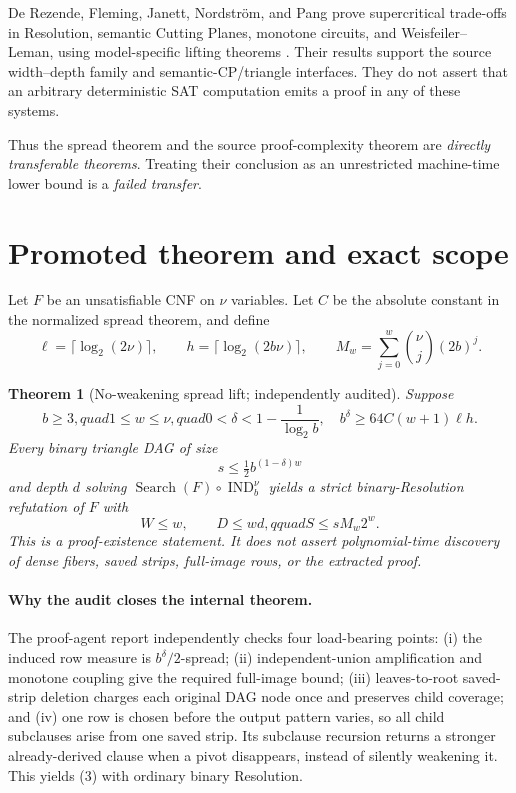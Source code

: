 \documentclass[11pt]{article}
\newtheorem{theorem}{Theorem}
\begin{document}
De Rezende, Fleming, Janett, Nordstr\"om, and Pang prove supercritical trade-offs in
Resolution, semantic Cutting Planes, monotone circuits, and Weisfeiler--Leman, using
model-specific lifting theorems \cite{tradeoff}.  Their results support the source
width--depth family and semantic-CP/triangle interfaces.  They do not assert that an
arbitrary deterministic SAT computation emits a proof in any of these systems.

Thus the spread theorem and the source proof-complexity theorem are
\emph{directly transferable theorems}.  Treating their conclusion as an unrestricted
machine-time lower bound is a \emph{failed transfer}.

\section{Promoted theorem and exact scope}
Let $F$ be an unsatisfiable CNF on $\nu$ variables.  Let $C$ be the absolute
constant in the normalized spread theorem, and define
\[
 \ell=\lceil\log_2(2\nu)\rceil,\qquad
 h=\lceil\log_2(2b\nu)\rceil,\qquad
 M_w=\sum_{j=0}^{w}\binom{\nu}{j}(2b)^j.
\]

\begin{theorem}[No-weakening spread lift; independently audited]
Suppose
\[
 b\ge3,quad 1\le w\le\nu,quad
 0<\delta<1-\frac1{\log_2 b},\quad
 b^\delta\ge64C(w+1)\ell h.                              \tag{2}
\]
Every binary triangle DAG of size
\[
 s\le\tfrac12 b^{(1-\delta)w}
\]
and depth $d$ solving $\operatorname{Search}(F)\circ\operatorname{IND}_b^\nu$
yields a strict binary-Resolution refutation of $F$ with
\[
 W\le w,\qquad D\le wd,qquad S\le sM_w2^w.              \tag{3}
\]
This is a proof-existence statement.  It does not assert polynomial-time discovery
of dense fibers, saved strips, full-image rows, or the extracted proof.
\end{theorem}

\paragraph{Why the audit closes the internal theorem.}
The proof-agent report
independently checks four load-bearing points: (i) the induced row measure is
$b^\delta/2$-spread; (ii) independent-union amplification and monotone coupling give
the required full-image bound; (iii) leaves-to-root saved-strip deletion charges each
original DAG node once and preserves child coverage; and (iv) one row is chosen before
the output pattern varies, so all child subclauses arise from one saved strip.  Its
subclause recursion returns a stronger already-derived clause when a pivot disappears,
instead of silently weakening it.  This yields (3) with ordinary binary Resolution.
\end{document}
